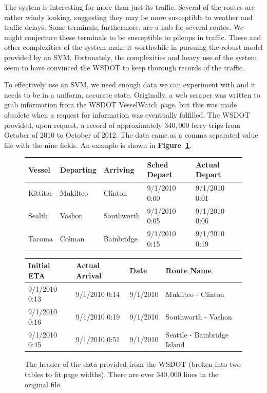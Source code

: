 \documentclass[11pt]{article} %
\begin{document}
The system is interesting for more than just its traffic. Several of the routes
are rather windy looking, suggesting they may be more susceptible to weather and
traffic delays. Some terminals, furthermore, are a hub for several routes. We
might conjecture these terminals to be susceptible to pileups in traffic. These 
and other complexities of the system make it worthwhile in pursuing the robust 
model provided by an SVM. Fortunately, the complexities and heavy use of the
system seem to have convinced the WSDOT to keep thorough records of the traffic.

To effectively use an SVM, we need enough data we can experiment with and it needs
to be in a uniform, accurate state. Originally, a web scraper was written to grab
information from the WSDOT VesselWatch \cite{wsdotVesselWatch} page, but this was 
made obsolete when a request for information was eventually fulfilled. The WSDOT 
provided, upon request, a record of
approximately $340,000$ ferry trips from October of 2010 to October of 2012. The
data came as a comma separated value file with the nine fields. An example is shown
in \textbf{Figure~\ref{fig:example_wsdot_data}}.

\begin{figure}
    \centering
    \begin{tabular}[h]{lllll}
        \hline
        Vessel & Departing & Arriving & Sched Depart & Actual Depart \\
        \hline
        Kittitas & Mukilteo & Clinton & 9/1/2010 0:00 & 9/1/2010 0:01 \\
        Sealth & Vashon & Southworth & 9/1/2010 0:05 & 9/1/2010 0:06 \\
        Tacoma & Colman & Bainbridge & 9/1/2010 0:15 & 9/1/2010 0:19 \\
    \end{tabular}

    \begin{tabular}[h]{llll}
        \hline
        Initial ETA & Actual Arrival & Date & Route Name\\
        \hline
        9/1/2010 0:13 & 9/1/2010 0:14 & 9/1/2010 & Mukilteo - Clinton \\
        9/1/2010 0:16 & 9/1/2010 0:19 & 9/1/2010 & Southworth - Vashon \\
        9/1/2010 0:45 & 9/1/2010 0:51 & 9/1/2010 & Seattle - Bainbridge Island \\
    \end{tabular}
    \caption{The header of the data provided from the WSDOT (broken into two tables
        to fit page widths). There are over $340,000$ lines in the original file.}
    \label{fig:example_wsdot_data}
\end{figure}
\end{document}
